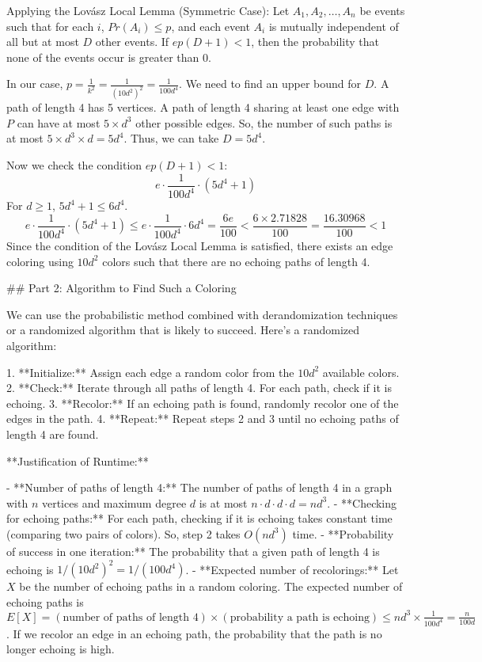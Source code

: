 \begin{enumerate}
\begin{shaded}
Applying the Lovász Local Lemma (Symmetric Case): Let $A_1, A_2, \dots, A_n$ be events such that for each $i$, $Pr(A_i) \le p$, and each event $A_i$ is mutually independent of all but at most $D$ other events. If $ep(D+1) < 1$, then the probability that none of the events occur is greater than 0.

In our case, $p = \frac{1}{k^2} = \frac{1}{(10d^2)^2} = \frac{1}{100d^4}$. We need to find an upper bound for $D$. A path of length 4 has 5 vertices. A path of length 4 sharing at least one edge with $P$ can have at most $5 \times d^3$ other possible edges. So, the number of such paths is at most $5 \times d^3 \times d = 5d^4$. Thus, we can take $D = 5d^4$.

Now we check the condition $ep(D+1) < 1$:
$$e \cdot \frac{1}{100d^4} \cdot (5d^4 + 1)$$
For $d \ge 1$, $5d^4 + 1 \le 6d^4$.
$$e \cdot \frac{1}{100d^4} \cdot (5d^4 + 1) \le e \cdot \frac{1}{100d^4} \cdot 6d^4 = \frac{6e}{100} < \frac{6 \times 2.71828}{100} = \frac{16.30968}{100} < 1$$
Since the condition of the Lovász Local Lemma is satisfied, there exists an edge coloring using $10d^2$ colors such that there are no echoing paths of length 4.

## Part 2: Algorithm to Find Such a Coloring

We can use the probabilistic method combined with derandomization techniques or a randomized algorithm that is likely to succeed. Here's a randomized algorithm:

1. **Initialize:** Assign each edge a random color from the $10d^2$ available colors.
2. **Check:** Iterate through all paths of length 4. For each path, check if it is echoing.
3. **Recolor:** If an echoing path is found, randomly recolor one of the edges in the path.
4. **Repeat:** Repeat steps 2 and 3 until no echoing paths of length 4 are found.

**Justification of Runtime:**

- **Number of paths of length 4:** The number of paths of length 4 in a graph with $n$ vertices and maximum degree $d$ is at most $n \cdot d \cdot d \cdot d = nd^3$.
- **Checking for echoing paths:** For each path, checking if it is echoing takes constant time (comparing two pairs of colors). So, step 2 takes $O(nd^3)$ time.
- **Probability of success in one iteration:** The probability that a given path of length 4 is echoing is $1/(10d^2)^2 = 1/(100d^4)$.
- **Expected number of recolorings:** Let $X$ be the number of echoing paths in a random coloring. The expected number of echoing paths is $E[X] = (\text{number of paths of length 4}) \times (\text{probability a path is echoing}) \le nd^3 \times \frac{1}{100d^4} = \frac{n}{100d}$. If we recolor an edge in an echoing path, the probability that the path is no longer echoing is high.


\end{shaded}
\end{enumerate}
